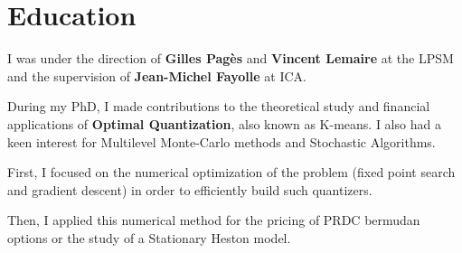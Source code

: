 \documentclass[]{deedy-resume-openfont}
\begin{document}
\sectionsep




\section{Education}
\sectionsep

I was under the direction of \textbf{Gilles Pagès} and \textbf{Vincent Lemaire} at the LPSM and the supervision of \textbf{Jean-Michel Fayolle} at ICA.

\vspace{0.2cm}
During my PhD, I made contributions to the theoretical study and financial applications of \textbf{Optimal Quantization}, also known as K-means. I also had a keen interest for Multilevel Monte-Carlo methods and Stochastic Algorithms.
\vspace{0.1cm}
\begin{tightemize}
	\item[\diamond] First, I focused on the numerical optimization of the problem (fixed point search and gradient descent) in order to efficiently build such quantizers.
	\item[\diamond] Then, I applied this numerical method for the pricing of PRDC bermudan options or the study of a Stationary Heston model.
\end{tightemize}

\sectionsep

\end{document}
